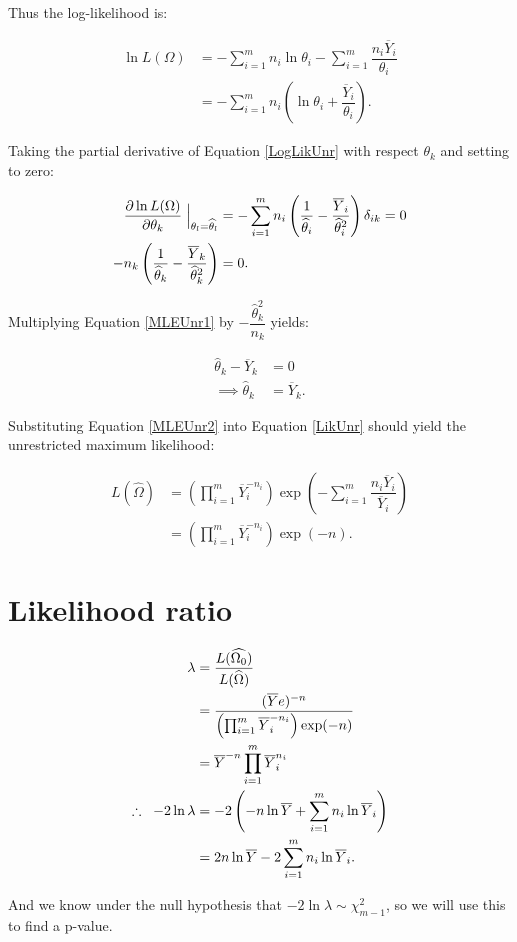 \documentclass[12pt,a4paper]{article}
\newcommand{\eqn}[1]{Equation \ref{#1}}
\newcommand{\ovY}{\overline{Y}}
\newcommand{\wth}{\widehat{\theta}}
\begin{document}
    Thus the log-likelihood is:

    \begin{align}
        \ln{L(\Omega)} &= -\sum_{i=1}^m n_i \ln{\theta_i} - \sum_{i=1}^m \dfrac{n_i\ovY_i}{\theta_i} \nonumber \\
        &= -\sum_{i=1}^m n_i\left(\ln{\theta_i} + \dfrac{\ovY_i}{\theta_i}\right). \label{LogLikUnr}
    \end{align}

    Taking the partial derivative of \eqn{LogLikUnr} with respect $\theta_k$ and setting to zero:

    \begin{align}
        \dfrac{\partial \ln{L(\Omega)}}{\partial \theta_k} \Bigm\lvert_{\theta_l = \wth_l} &= -\sum_{i=1}^m n_i\left(\dfrac{1}{\wth_i} - \dfrac{\ovY_i}{\wth_i^2}\right) \delta_{ik} = 0 \nonumber\\
        -n_k\left(\dfrac{1}{\wth_k}-\dfrac{\ovY_k}{\wth_k^2}\right) &= 0. \label{MLEUnr1}
    \end{align}

    Multiplying \eqn{MLEUnr1} by $-\dfrac{\wth_k^2}{n_k}$ yields:

    \begin{align}
        \wth_k - \ovY_k &= 0 \nonumber\\
        \implies \wth_k &= \ovY_k. \label{MLEUnr2}
    \end{align}

    Substituting \eqn{MLEUnr2} into \eqn{LikUnr} should yield the unrestricted maximum likelihood:

    \begin{align}
        L(\widehat{\Omega}) &= \left(\prod_{i=1}^m \ovY_i^{-n_i}\right) \exp\left(-\sum_{i=1}^m \dfrac{n_i\ovY_i}{\ovY_i}\right) \nonumber \\
        &= \left(\prod_{i=1}^m \ovY_i^{-n_i}\right)\exp(-n). \label{MLUnr}
    \end{align}

    \section{Likelihood ratio}
    \begin{align}
        \lambda &= \dfrac{L(\widehat{\Omega_0})}{L(\widehat{\Omega})} \nonumber \\
        &= \dfrac{(\ovY e)^{-n}}{\left(\prod_{i=1}^m \ovY_i^{-n_i}\right)\exp(-n)} \nonumber\\
        &= \ovY^{-n} \prod_{i=1}^m \ovY_i^{n_i} \nonumber \\
        \therefore \hspace{0.2cm} -2\ln{\lambda} &= -2 \left(-n\ln{\ovY} + \sum_{i=1}^m n_i \ln{\ovY_i}\right) \nonumber\\
        &= 2n\ln{\ovY} - 2\sum_{i=1}^{m} n_i \ln{\ovY_i}. \label{testSt} 
    \end{align}

    And we know under the null hypothesis that $-2\ln{\lambda} \sim \chi^2_{m-1}$, so we will use this to find a p-value.
\end{document}
